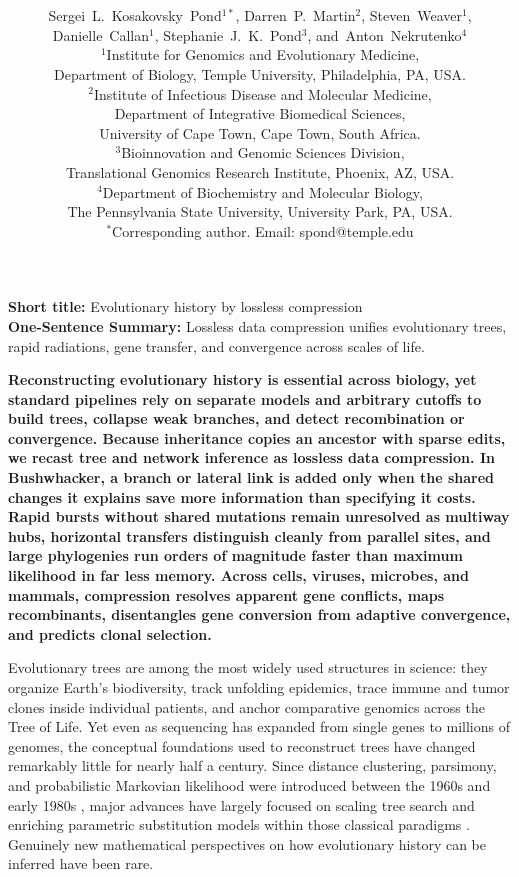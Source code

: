 \documentclass[12pt]{article}
\date{}
\title{\bfseries \boldmath \scititle}
\author{
	Sergei~L.~Kosakovsky~Pond$^{1\ast}$,
	Darren~P.~Martin$^{2}$,
	Steven~Weaver$^{1}$,\\
	Danielle~Callan$^{1}$,
	Stephanie~J.~K.~Pond$^{3}$,
	and~Anton~Nekrutenko$^{4}$\\ %
	\small$^{1}$Institute for Genomics and Evolutionary Medicine,\\
	\small Department of Biology, Temple University, Philadelphia, PA, USA.\\
	\small$^{2}$Institute of Infectious Disease and Molecular Medicine,\\
	\small Department of Integrative Biomedical Sciences,\\
	\small University of Cape Town, Cape Town, South Africa.\\
	\small$^{3}$Bioinnovation and Genomic Sciences Division,\\
	\small Translational Genomics Research Institute, Phoenix, AZ, USA.\\
	\small$^{4}$Department of Biochemistry and Molecular Biology,\\
	\small The Pennsylvania State University, University Park, PA, USA.\\
	\small$^\ast$Corresponding author. Email: spond@temple.edu
}
\renewenvironment{abstract}
	{\quotation}
	{\endquotation}
\begin{document}
\maketitle

\noindent\textbf{Short title:} Evolutionary history by lossless compression\\[0.3em]
\noindent\textbf{One-Sentence Summary:} Lossless data compression unifies evolutionary trees, rapid radiations, gene transfer, and convergence across scales of life.

\begin{abstract} \bfseries \boldmath
Reconstructing evolutionary history is essential across biology, yet standard pipelines rely on separate models and arbitrary cutoffs to build trees, collapse weak branches, and detect recombination or convergence. Because inheritance copies an ancestor with sparse edits, we recast tree and network inference as lossless data compression. In Bushwhacker, a branch or lateral link is added only when the shared changes it explains save more information than specifying it costs. Rapid bursts without shared mutations remain unresolved as multiway hubs, horizontal transfers distinguish cleanly from parallel sites, and large phylogenies run orders of magnitude faster than maximum likelihood in far less memory. Across cells, viruses, microbes, and mammals, compression resolves apparent gene conflicts, maps recombinants, disentangles gene conversion from adaptive convergence, and predicts clonal selection.
\end{abstract}

\noindent
Evolutionary trees are among the most widely used structures in science: they organize Earth's biodiversity, track unfolding epidemics, trace immune and tumor clones inside individual patients, and anchor comparative genomics across the Tree of Life. Yet even as sequencing has expanded from single genes to millions of genomes, the conceptual foundations used to reconstruct trees have changed remarkably little for nearly half a century. Since distance clustering, parsimony, and probabilistic Markovian likelihood were introduced between the 1960s and early 1980s \cite{fitch1971toward,felsenstein1981evolutionary,saitou1987neighbor}, major advances have largely focused on scaling tree search and enriching parametric substitution models within those classical paradigms \cite{price2010fasttree,kozlov2019raxml,minh2020iqtree}. Genuinely new mathematical perspectives on how evolutionary history can be inferred have been rare.
\end{document}
